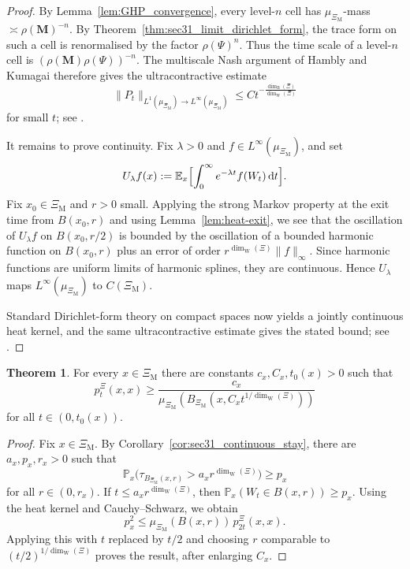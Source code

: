 \documentclass{article}
\theoremstyle{plain}
\theoremstyle{definition}
\newtheorem{theorem}{Theorem}[section]
\newcommand{\dimbox}{\dim_\mathrm{B}}
\newcommand{\dimwalk}{\dim_\mathrm{W}}
\begin{document}
\begin{proof}
By Lemma~\ref{lem:GHP_convergence}, every level-$n$ cell has $\mu_{\Xi_{\mathrm M}}$-mass $\asymp \rho(\mathbf M)^{-n}$.
By Theorem~\ref{thm:sec31_limit_dirichlet_form}, the trace form on such a cell is renormalised by the factor $\rho(\Psi)^n$.
Thus the time scale of a level-$n$ cell is $(\rho(\mathbf M)\rho(\Psi))^{-n}$.
The multiscale Nash argument of Hambly and Kumagai therefore gives the ultracontractive estimate
\[
\|P_t\|_{L^1(\mu_{\Xi_{\mathrm M}})\to L^\infty(\mu_{\Xi_{\mathrm M}})}
\le
C t^{-\frac{\dimbox(\Xi)}{\dimwalk(\Xi)}}
\]
for small $t$; see \cite{hambly1999transition,hambly2010diffusion,kumagai2004heat}.

It remains to prove continuity.
Fix $\lambda>0$ and $f\in L^\infty(\mu_{\Xi_{\mathrm M}})$, and set
\[
U_\lambda f(x):=\mathbb E_x\Bigl[\int_0^\infty e^{-\lambda t}f(W_t)\,\mathrm dt\Bigr].
\]
Fix $x_0\in \Xi_{\mathrm M}$ and $r>0$ small.
Applying the strong Markov property at the exit time from $B(x_0,r)$ and using Lemma~\ref{lem:heat-exit}, we see that the oscillation of $U_\lambda f$ on $B(x_0,r/2)$ is bounded by the oscillation of a bounded harmonic function on $B(x_0,r)$ plus an error of order $r^{\dimwalk(\Xi)}\|f\|_\infty$.
Since harmonic functions are uniform limits of harmonic splines, they are continuous.
Hence $U_\lambda$ maps $L^\infty(\mu_{\Xi_{\mathrm M}})$ to $C(\Xi_{\mathrm M})$.

Standard Dirichlet-form theory on compact spaces now yields a jointly continuous heat kernel, and the same ultracontractive estimate gives the stated bound; see \cite{fukushima1994dirichlet,kumagai2004heat}.
\end{proof}

\begin{theorem}\label{thm:general-lower}
For every $x\in \Xi_{\mathrm M}$ there are constants $c_x,C_x,t_0(x)>0$ such that
\[
p_t^\Xi(x,x)
\ge
\frac{c_x}{\mu_{\Xi_{\mathrm M}}(B_{\Xi_{\mathrm M}}(x,C_x t^{1/\dimwalk(\Xi)}))}
\]
for all $t\in(0,t_0(x))$.
\end{theorem}

\begin{proof}
Fix $x\in \Xi_{\mathrm M}$.
By Corollary~\ref{cor:sec31_continuous_stay}, there are $a_x,p_x,r_x>0$ such that
\[
\mathbb P_x\bigl(\tau_{B_{\Xi_{\mathrm M}}(x,r)}>a_xr^{\dimwalk(\Xi)}\bigr)\ge p_x
\]
for all $r\in(0,r_x)$.
If $t\le a_xr^{\dimwalk(\Xi)}$, then $\mathbb P_x(W_t\in B(x,r))\ge p_x$.
Using the heat kernel and Cauchy--Schwarz, we obtain
\[
p_x^2
\le
\mu_{\Xi_{\mathrm M}}(B(x,r))\,p_{2t}^\Xi(x,x).
\]
Applying this with $t$ replaced by $t/2$ and choosing $r$ comparable to $(t/2)^{1/\dimwalk(\Xi)}$ proves the result, after enlarging $C_x$.
\end{proof}
\end{document}
